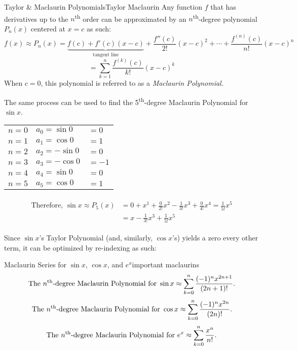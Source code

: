 \documentclass[10pt]{article}
\theoremstyle{definition}
\begin{document}
\begin{theorem}{Taylor \& Maclaurin Polynomials}{Taylor Maclaurin}
    Any function $f$ that has derivatives up to the $n$\textsuperscript{th} order can be approximated by an $n$\textsuperscript{th}-degree polynomial $P_n(x)$ centered at $x=c$ as such:
    \[f(x) \approx P_n(x)= \underbrace{f(c)+f'(c)(x-c)}_{\text{tangent line}}+\frac{f''(c)}{2!}(x-c)^2 + \cdots + \frac{f^{(n)}(c)}{n!}(x-c)^n\]
    \[= \sum_{k=1}^{n} \frac{f^{(k)}(c)}{k!}(x-c)^k\]
    When $c=0$, this polynomial is referred to as a \textit{Maclaurin Polynomial.}
\end{theorem}

The same process can be used to find the 5\textsuperscript{th}-degree Maclaurin Polynomial for $\sin x$.

\begin{center}
\begin{tabular}{l l l}
$n=0$    &$a_0=\sin 0$ & $= 0$ \\
$n=1$    &$a_1=\cos 0$ & $=1$ \\
$n=2$    &$a_2=-\sin 0$ & $= 0$ \\
$n=3$    &$a_3=-\cos 0$ & $= -1$ \\
$n=4$    &$a_4=\sin 0$ & $= 0$ \\
$n=5$    &$a_5=\cos 0$ & $= 1$ \\
\end{tabular}
\end{center}

\begin{align*}
\begin{split}
    \text{Therefore, } \sin x \approx P_5(x)&=0+x^1+\frac{0}{2!}x^2 - \frac{1}{3!}x^3 + \frac{0}{4!}x^4  = \frac{1}{5!}x^5\\
    &= x- \frac{1}{3!}x^3 + \frac{1}{5!}x^5
\end{split}
\end{align*}

Since $\sin x $'s Taylor Polynomial (and, similarly, $\cos x$'s) yields a zero every other term, it can be optimized by re-indexing as such:

\begin{theorem}{Maclaurin Series for $\sin x$, $\cos x$, and $e^x$}{important maclaurins}
\vspace{-.3cm}
    \[\text{The $n$\textsuperscript{th}-degree Maclaurin Polynomial for }\sin x \approx \sum_{k=0}^{n} \frac{(-1)^nx^{2n+1}}{(2n+1)!}.\]
\vspace{-.3cm}
    \[\text{The $n$\textsuperscript{th}-degree Maclaurin Polynomial for }\cos x \approx \sum_{k=0}^{n} \frac{(-1)^nx^{2n}}{(2n)!}.\]
\vspace{-.3cm}
    \[\text{The $n$\textsuperscript{th}-degree Maclaurin Polynomial for }e^x \approx \sum_{k=0}^{n} \frac{x^n}{n!}.\]
\end{theorem}
\end{document}
